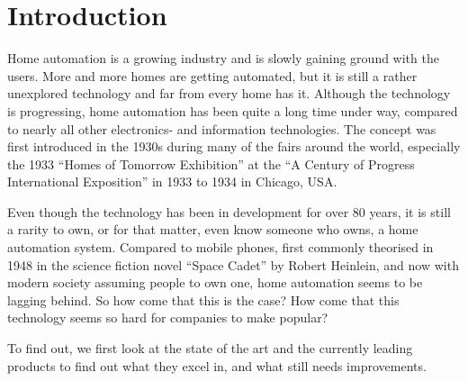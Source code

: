 \chapter{Introduction}\label{part:introduction}

Home automation is a growing industry and is slowly gaining ground with the users. More and more homes are getting automated, but it is still a rather unexplored technology and far from every home has it. Although the technology is progressing, home automation has been quite a long time under way, compared to nearly all other electronics- and information technologies. The concept was first introduced in the 1930s during many of the fairs around the world, especially the 1933 \enquote{Homes of Tomorrow Exhibition} at the \enquote{A Century of Progress International Exposition} in 1933 to 1934 in Chicago, USA.

Even though the technology has been in development for over 80 years, it is still a rarity to own, or for that matter, even know someone who owns, a home automation system. Compared to mobile phones, first commonly theorised in 1948 in the science fiction novel \enquote{Space Cadet} by Robert Heinlein, and now with modern society assuming people to own one, home automation seems to be lagging behind. So how come that this is the case? How come that this technology seems so hard for companies to make popular?

To find out, we first look at the state of the art and the currently leading products to find out what they excel in, and what still needs improvements.

